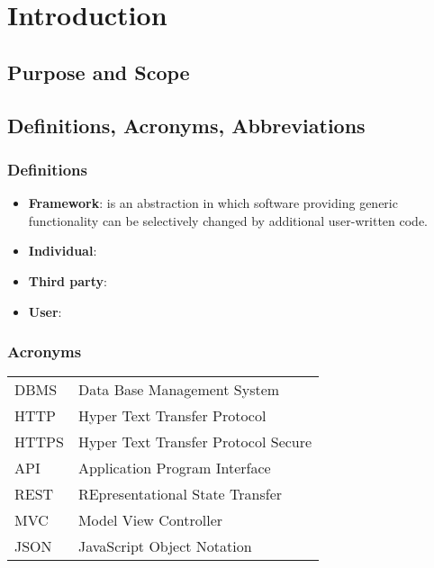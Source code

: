 \section{Introduction}
\subsection{Purpose and Scope}


\subsection{Definitions, Acronyms, Abbreviations}

\subsubsection{Definitions}
\begin{itemize}
	\item \textbf{Framework}: is an abstraction in which software providing generic functionality can be selectively changed by additional user-written code.
	\item \textbf{Individual}:
	
	\item \textbf{Third party}:
	
	\item \textbf{User}:
	
\end{itemize}

\subsubsection{Acronyms}

\begin{center}
	\begin{tabular}{| l | l |}
		\hline
		DBMS & Data Base Management System\\
		HTTP & Hyper Text Transfer Protocol\\
		HTTPS & Hyper Text Transfer Protocol Secure\\
		API & Application Program Interface \\
		REST & REpresentational State Transfer\\
		MVC & Model View Controller\\
		JSON & JavaScript Object Notation \\
		\hline
	\end{tabular}
\end{center}

